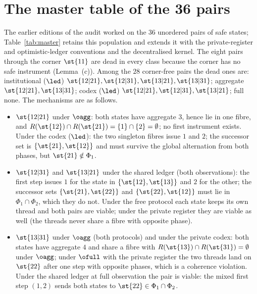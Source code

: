 \section{The master table of the 36 pairs}\label{si:master}

The earlier editions of the audit worked on the $36$ unordered pairs of safe states; Table~\ref{tab:master} retains this population and extends it with the private-register and optimistic-ledger conventions and the decentralised kernel. The eight pairs through the corner $\st{11}$ are dead in every class because the corner has no safe instrument (Lemma~(c)). Among the $28$ corner-free pairs the dead ones are: institutional ($\led$) $\st{12|21},\st{12|31},\st{13|21},\st{13|31}$; aggregate $\st{12|21},\st{13|31}$; codex ($\led$) $\st{12|21},\st{12|31},\st{13|21}$; full none. The mechanisms are as follows.
\begin{itemize}[leftmargin=2em,itemsep=1pt]
\item $\st{12|21}$ under $\oagg$: both states have aggregate $3$, hence lie in one fibre, and $R(\st{12})\cap R(\st{21})=\{1\}\cap\{2\}=\emptyset$; no first instrument exists. Under the codex ($\led$): the two singleton fibres issue $1$ and $2$; the successor set is $\{\st{21},\st{12}\}$ and must survive the global alternation from both phases, but $\st{21}\notin\Phi_1$.
\item $\st{12|31}$ and $\st{13|21}$ under the shared ledger (both observations): the first step issues $1$ for the state in $\{\st{12},\st{13}\}$ and $2$ for the other; the successor sets $\{\st{21},\st{22}\}$ and $\{\st{22},\st{12}\}$ must lie in $\Phi_1\cap\Phi_2$, which they do not. Under the free protocol each state keeps its own thread and both pairs are viable; under the private register they are viable as well (the threads never share a fibre with opposite phase).
\item $\st{13|31}$ under $\oagg$ (both protocols) and under the private codex: both states have aggregate $4$ and share a fibre with $R(\st{13})\cap R(\st{31})=\emptyset$ under $\oagg$; under $\ofull$ with the private register the two threads land on $\st{22}$ after one step with opposite phases, which is a coherence violation. Under the shared ledger at full observation the pair is viable: the mixed first step $(1,2)$ sends both states to $\st{22}\in\Phi_1\cap\Phi_2$.
\end{itemize}



